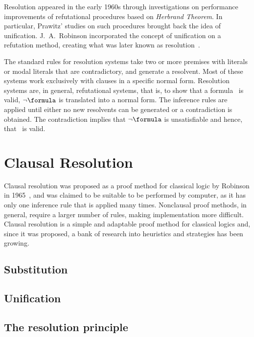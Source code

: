 Resolution appeared in the early 1960s through investigations on performance
improvements of refutational procedures based on \emph{Herbrand Theorem}. In
particular, Prawitz' studies on such procedures brought back the idea of
unification. J.~A.~Robinson incorporated the concept of unification on a
refutation method, creating what was later known as resolution~\cite{casanova}. 

The standard rules for resolution systems take two or more premises with literals or
modal literals that are contradictory, and generate a resolvent. Most of these
systems work exclusively with clauses in a specific normal form. Resolution
systems are, in general, refutational systems, that is, to show that a
formula \formula~is valid, $\neg \formula$ is translated into a normal form. The
inference rules are applied until either no new resolvents can be generated or a
contradiction is obtained. The contradiction implies that $\neg \formula$ is
unsatisfiable and hence, that \formula~is valid.


\section{Clausal Resolution}

Clausal resolution was proposed as a proof method for classical logic by
Robinson in 1965~\cite{Robinson65}, and was claimed to be suitable to be
performed by computer, as it has only one inference rule that is applied
many times. Nonclausal proof methods, in general, require a larger number of
rules, making implementation more difficult. Clausal resolution is a simple and
adaptable proof method for classical logics and, since it was proposed, a bank
of research into heuristics and strategies has been growing. 

\subsection{Substitution}

\subsection{Unification}

\subsection{The resolution principle}
